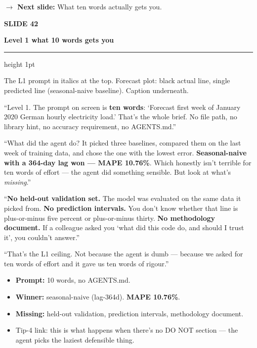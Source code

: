 \documentclass[11pt,a4paper]{article}
\newcommand{\slidehead}[2]{%
  \vspace{2pt}%
  {\small\color{mutedgrey}\textbf{SLIDE #1}}\par
  {\LARGE\color{jrcblue}\bfseries #2}\par
  \vspace{6pt}%
  {\color{jrcblue}\hrule height 1pt}%
  \vspace{8pt}%
}
\newcommand{\block}[1]{\par\vspace{4pt}{\small\color{jrcblue}\textbf{\MakeUppercase{#1}}}\par\vspace{2pt}}
\newenvironment{anchors}{%
  \begin{tcolorbox}[colback=jrcblue!6, colframe=jrcblue!50, boxrule=0.6pt, arc=2pt,
                    left=10pt, right=10pt, top=6pt, bottom=6pt, fontupper=\small,
                    title={\bfseries Anchor facts}, coltitle=jrcblue,
                    fonttitle=\small\bfseries, attach title to upper,
                    after title={\par\vspace{2pt}}]
}{%
  \end{tcolorbox}
}
\newenvironment{sayblock}{%
  \begin{tcolorbox}[colback=cardbg, colframe=jrcblue, boxrule=0.8pt, arc=2pt,
                    left=10pt, right=10pt, top=6pt, bottom=6pt, fontupper=\normalsize,
                    title={\bfseries Say this}, coltitle=white, colbacktitle=jrcblue,
                    fonttitle=\small\bfseries]
}{%
  \end{tcolorbox}
}
\newcommand{\transition}[1]{%
  \par\vspace{4pt}%
  \begin{tcolorbox}[colback=white, colframe=mutedgrey!40, boxrule=0.5pt, arc=2pt,
                    left=10pt, right=10pt, top=4pt, bottom=4pt, fontupper=\small]
    {\color{mutedgrey}\textbf{\textsf{$\to$ Next slide:}}} #1
  \end{tcolorbox}
}
\begin{document}
\transition{What ten words actually gets you.}

\newpage

\slidehead{42}{Level 1 \textendash{} what 10 words gets you}

\block{On screen}
The L1 prompt in italics at the top. Forecast plot: black actual line, single
predicted line (seasonal-naive baseline). Caption underneath.

\begin{sayblock}
``Level 1. The prompt on screen is \textbf{ten words}: `Forecast first week of
January 2020 German hourly electricity load.' That's the whole brief. No file
path, no library hint, no accuracy requirement, no AGENTS.md.''\par\vspace{6pt}

``What did the agent do? It picked three baselines, compared them on the last
week of training data, and chose the one with the lowest error.
\textbf{Seasonal-naive with a 364-day lag won — MAPE 10.76\%}. Which honestly
isn't terrible for ten words of effort — the agent did something sensible.
But look at what's \emph{missing}.''\par\vspace{4pt}

``\textbf{No held-out validation set.} The model was evaluated on the same
data it picked from. \textbf{No prediction intervals.} You don't know whether
that line is plus-or-minus five percent or plus-or-minus thirty. \textbf{No
methodology document.} If a colleague asked you `what did this code do, and
should I trust it', you couldn't answer.''\par\vspace{4pt}

``That's the L1 ceiling. Not because the agent is dumb — because we asked for
ten words of effort and it gave us ten words of rigour.''
\end{sayblock}

\begin{anchors}
\begin{itemize}
\item \textbf{Prompt:} 10 words, no AGENTS.md.
\item \textbf{Winner:} seasonal-naive (lag-364d). \textbf{MAPE 10.76\%}.
\item \textbf{Missing:} held-out validation, prediction intervals, methodology document.
\item Tip-4 link: this is what happens when there's no DO NOT section — the agent picks the laziest defensible thing.
\end{itemize}
\end{anchors}
\end{document}
